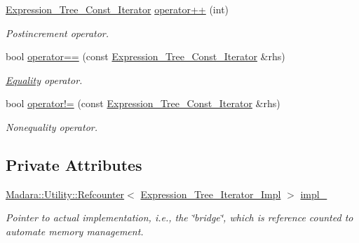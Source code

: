 \begin{DoxyCompactItemize}
\hyperlink{classMadara_1_1Expression__Tree_1_1Expression__Tree__Const__Iterator}{Expression\_\-Tree\_\-Const\_\-Iterator} \hyperlink{classMadara_1_1Expression__Tree_1_1Expression__Tree__Const__Iterator_acd2d360ef67e79c3b87fa4b64e87c478}{operator++} (int)
\begin{DoxyCompactList}\small\item\em Postincrement operator. \item\end{DoxyCompactList}\item 
bool \hyperlink{classMadara_1_1Expression__Tree_1_1Expression__Tree__Const__Iterator_ae015fc57c47147118a0a3c665625cf66}{operator==} (const \hyperlink{classMadara_1_1Expression__Tree_1_1Expression__Tree__Const__Iterator}{Expression\_\-Tree\_\-Const\_\-Iterator} \&rhs)
\begin{DoxyCompactList}\small\item\em \hyperlink{classMadara_1_1Expression__Tree_1_1Equality}{Equality} operator. \item\end{DoxyCompactList}\item 
bool \hyperlink{classMadara_1_1Expression__Tree_1_1Expression__Tree__Const__Iterator_ac274d10494eb363531c0045e21a82561}{operator!=} (const \hyperlink{classMadara_1_1Expression__Tree_1_1Expression__Tree__Const__Iterator}{Expression\_\-Tree\_\-Const\_\-Iterator} \&rhs)
\begin{DoxyCompactList}\small\item\em Nonequality operator. \item\end{DoxyCompactList}\end{DoxyCompactItemize}
\subsection*{Private Attributes}
\begin{DoxyCompactItemize}
\item 
\hyperlink{classMadara_1_1Utility_1_1Refcounter}{Madara::Utility::Refcounter}$<$ \hyperlink{classMadara_1_1Expression__Tree_1_1Expression__Tree__Iterator__Impl}{Expression\_\-Tree\_\-Iterator\_\-Impl} $>$ \hyperlink{classMadara_1_1Expression__Tree_1_1Expression__Tree__Const__Iterator_aa504f91f96ec604952c5aa5c6f7f9d85}{impl\_\-}
\begin{DoxyCompactList}\small\item\em Pointer to actual implementation, i.e., the \char`\"{}bridge\char`\"{}, which is reference counted to automate memory management. \item\end{DoxyCompactList}\end{DoxyCompactItemize}


